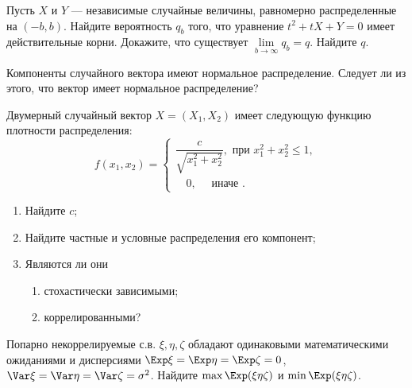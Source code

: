 


\begin{problem}
Пусть $X$ и $Y$ --- независимые случайные величины, равномерно распределенные на $(-b,b)$. 
Найдите вероятность $q_b$ того, что уравнение $t^2+tX+Y=0$ имеет действительные корни. Докажите, что 
существует $\lim\limits_{b\to\infty} q_b=q$. Найдите $q$. 
\end{problem}


\begin{problem}
Компоненты случайного вектора имеют нормальное распределение. Следует ли из этого, что вектор имеет нормальное распределение? 
\end{problem}

\begin{problem}
Двумерный случайный вектор $X=(X_1,X_2)$  имеет следующую функцию плотности распределения: 
$$
f(x_1,x_2)=\begin{cases}
\dfrac{c}{\sqrt{x_1^2+x_2^2}}, \text{ при } x_1^2+x_2^2\leqslant 1 , \\
\quad 0, \quad\text{ иначе }. 
\end{cases}
$$
\begin{enumerate}
\item Найдите $c$;
\item Найдите частные и условные распределения его компонент; 
\item Являются ли они 
\begin{enumerate}
\item стохастически зависимыми; 
\item коррелированными? 
\end{enumerate}
\end{enumerate}
\end{problem}

\begin{problem}
Попарно некоррелируемые с.в. $\xi, \eta, \zeta$ обладают одинаковыми математическими ожиданиями и дисперсиями $\Exp\xi = \Exp\eta = \Exp\zeta = 0$, $\Var\xi = \Var\eta = \Var\zeta = \sigma^2$. Найдите $\max \Exp(\xi\eta\zeta)$ и $\min \Exp(\xi\eta\zeta)$.
\end{problem}

